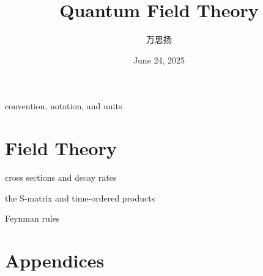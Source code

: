 \documentclass[10pt, a4paper]{report}
\title{\Huge \textbf{Quantum Field Theory}}
\author{万思扬}
\date{June 24, 2025}
\renewcommand{\chaptermark}[1]{%
	\markboth{Chapter \thechapter\ #1}{}%
}
\numberwithin{equation}{section}
\begin{document}
	\maketitle
	
	\tableofcontents
	
	\pagebreak
	
	{convention, notation, and units}
	
	\part{Field Theory}
	
	{cross sections and decay rates}
	
	{the S-matrix and time-ordered products}
	
	{Feynman rules}
	
	\appendix
	
	\part*{Appendices}
	\renewcommand{\chaptermark}[1]{%
		\markboth{Appendix \thechapter\ #1}{}%
	}
\end{document}
